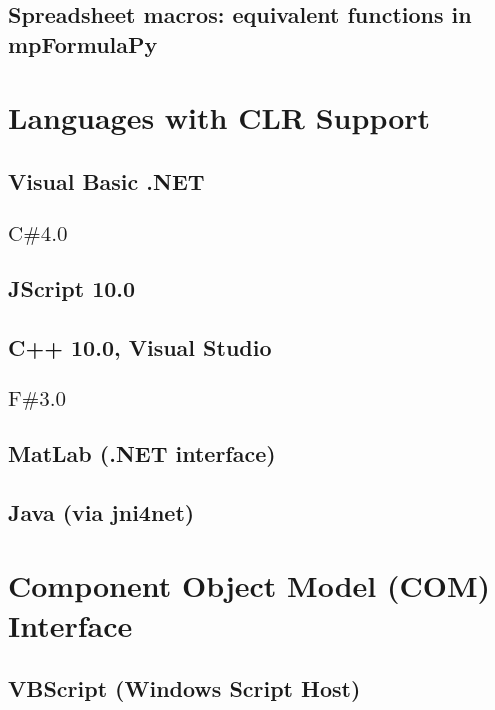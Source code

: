 \documentclass[12pt,a4paper,openany]{book}
\begin{document}
\section{Spreadsheet macros: equivalent functions in mpFormulaPy}

\chapter{Languages with CLR Support}

\section{Visual Basic .NET}

\section{\texorpdfstring {$\text {C\# 4.0 } $}{CSharp}}

\section{JScript 10.0}

\section{C++ 10.0, Visual Studio}

\section{\texorpdfstring {$\text {F\# 3.0 } $}{FSharp}}

\section{MatLab (.NET interface)}

\section{Java (via jni4net)}

\chapter{Component Object Model (COM) Interface}

\section{VBScript (Windows Script Host)}
\end{document}
